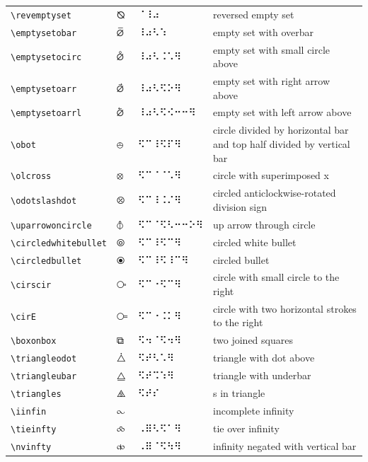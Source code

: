 \documentclass[oneside]{article}
\begin{document}
\begin{longtable}{llll}
\verb|\revemptyset| & $\revemptyset$ &  ⠈⠸⠴   & {reversed empty set} \\[2ex]
\verb|\emptysetobar| & $\emptysetobar$ &  ⠸⠴⠣⠱  & {empty set with overbar} \\[2ex]
\verb|\emptysetocirc| & $\emptysetocirc$ &  ⠸⠴⠣⠨⠡⠻  & {empty set with small circle above} \\[2ex]
\verb|\emptysetoarr| & $\emptysetoarr$ &  ⠸⠴⠣⠫⠕⠻  & {empty set with right arrow above} \\[2ex]
\verb|\emptysetoarrl| & $\emptysetoarrl$ &  ⠸⠴⠣⠫⠪⠒⠒⠻  & {empty set with left arrow above} \\[2ex]
\verb|\obot| & $\obot$ &  ⠫⠉⠸⠫⠏⠻  & \begin{minipage}[t]{8cm}{circle divided by horizontal bar and top half divided by vertical bar}
\end{minipage}\\[4ex]
\verb|\olcross| & $\olcross$ &  ⠫⠉⠈⠈⠡⠻  & {circle with superimposed x} \\[2ex]
\verb|\odotslashdot| & $\odotslashdot$ &  ⠫⠉⠸⠨⠌⠻  & {circled anticlockwise-rotated division sign} \\[2ex]
\verb|\uparrowoncircle| & $\uparrowoncircle$ &  ⠫⠉⠈⠫⠣⠒⠒⠕⠻  & {up arrow through circle} \\[2ex]
\verb|\circledwhitebullet| & $\circledwhitebullet$ &  ⠫⠉⠸⠫⠉⠻  & {circled white bullet} \\[2ex]
\verb|\circledbullet| & $\circledbullet$ &  ⠫⠉⠸⠫⠸⠉⠻  & {circled bullet} \\[2ex]
\verb|\cirscir| & $\cirscir$ &  ⠫⠉⠐⠫⠉⠻  & {circle with small circle to the right} \\[2ex]
\verb|\cirE| & $\cirE$ &  ⠫⠉⠐⠨⠅⠻  & {circle with two horizontal strokes to the right} \\[2ex]
\verb|\boxonbox| & $\boxonbox$ &  ⠫⠲⠈⠫⠲⠻  & {two joined squares} \\[2ex]
\verb|\triangleodot| & $\triangleodot$ &  ⠫⠞⠣⠡⠻  & {triangle with dot above} \\[2ex]
\verb|\triangleubar| & $\triangleubar$ &  ⠫⠞⠩⠱⠻  & {triangle with underbar} \\[2ex]
\verb|\triangles| & $\triangles$ &  ⠫⠞⠎  & {s in triangle} \\[2ex]
\verb|\iinfin| & $\iinfin$ &    & {incomplete infinity} \\[2ex]
\verb|\tieinfty| & $\tieinfty$ &  ⠠⠿⠣⠫⠁⠻  & {tie over infinity} \\[2ex]
\verb|\nvinfty| & $\nvinfty$ &  ⠠⠿⠈⠫⠳⠻  & {infinity negated with vertical bar} \\[2ex]

\end{longtable}
\end{document}
